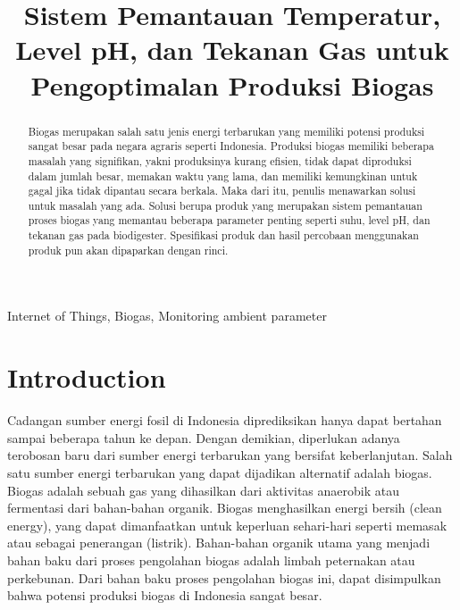\documentclass[conference]{IEEEtran}
\begin{document}
\title{Sistem Pemantauan Temperatur, Level pH, dan Tekanan Gas untuk Pengoptimalan Produksi Biogas}

\author{
}


\maketitle

\begin{abstract}
    Biogas merupakan salah satu jenis energi terbarukan yang memiliki potensi produksi sangat besar pada negara agraris seperti Indonesia. Produksi biogas memiliki beberapa masalah yang signifikan, yakni produksinya kurang efisien, tidak dapat diproduksi dalam jumlah besar, memakan waktu yang lama, dan memiliki kemungkinan untuk gagal jika tidak dipantau secara berkala. Maka dari itu, penulis menawarkan solusi untuk masalah yang ada. Solusi berupa produk yang merupakan sistem pemantauan proses biogas yang memantau beberapa parameter penting seperti suhu, level pH, dan tekanan gas pada biodigester. Spesifikasi produk dan hasil percobaan menggunakan produk pun akan dipaparkan dengan rinci.
\end{abstract}

\begin{IEEEkeywords}
Internet of Things, Biogas, Monitoring ambient parameter
\end{IEEEkeywords}

\section{Introduction}
Cadangan sumber energi fosil di Indonesia diprediksikan hanya dapat bertahan sampai beberapa tahun ke depan. Dengan demikian, diperlukan adanya terobosan baru dari sumber energi terbarukan yang bersifat keberlanjutan. Salah satu sumber energi terbarukan yang dapat dijadikan alternatif adalah biogas. Biogas adalah sebuah gas yang dihasilkan dari aktivitas anaerobik atau fermentasi dari bahan-bahan organik. Biogas menghasilkan energi bersih (clean energy), yang dapat dimanfaatkan untuk keperluan sehari-hari seperti memasak atau sebagai penerangan (listrik). Bahan-bahan organik utama yang menjadi bahan baku dari proses pengolahan biogas adalah limbah peternakan atau perkebunan. Dari bahan baku proses pengolahan biogas ini, dapat disimpulkan bahwa potensi produksi biogas di Indonesia sangat besar.  
\end{document}

